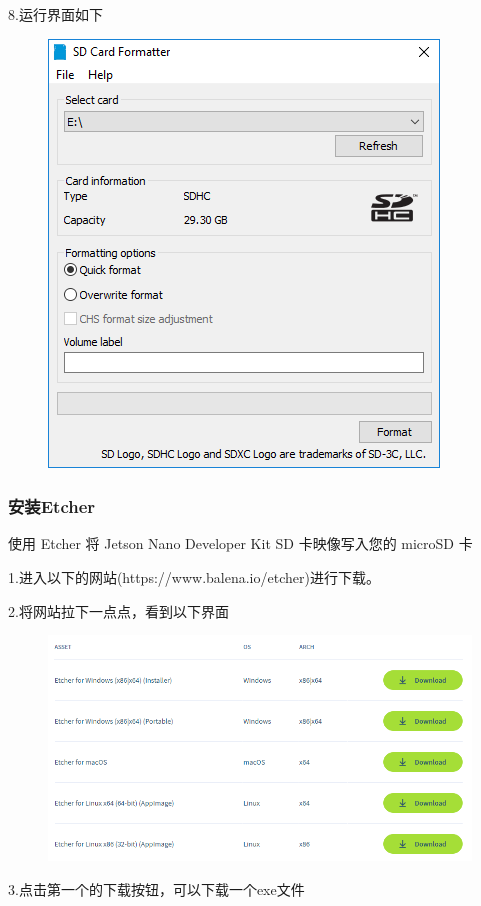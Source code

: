 \documentclass[openbib]{article}
\begin{document}
8.运行界面如下
\begin{figure}[H]
	\centering
	\includegraphics[scale=0.4]{SD Card Formatter}
\end{figure}

\subsubsection{安装Etcher}
使用 Etcher 将 Jetson Nano Developer Kit SD 卡映像写入您的 microSD 卡

1.进入以下的网站(https://www.balena.io/etcher)进行下载。


2.将网站拉下一点点，看到以下界面
\begin{figure}[H]
	\centering
	\includegraphics[scale=0.35]{b1}
\end{figure}

3.点击第一个的下载按钮，可以下载一个exe文件
\end{document}
